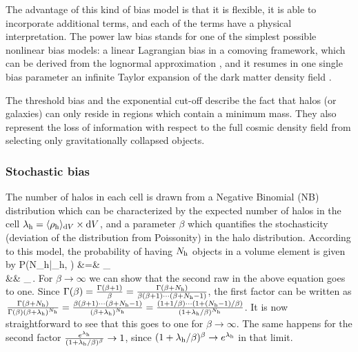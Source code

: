 The advantage of this kind of bias model is that it is flexible, it is able to incorporate additional terms, and each of the terms have a physical interpretation.
The power law bias stands for one of the simplest possible nonlinear bias models: a linear Lagrangian bias in a comoving framework, which can be derived from the lognormal approximation \citep[see][]{kitaura2015}, and it resumes in one single bias parameter an infinite Taylor expansion of the dark matter density field \citep{cen1993,fry1993,delatorre}.

The threshold bias and the exponential cut-off describe the fact that halos (or galaxies) can only reside in regions which contain a minimum mass. They also represent the loss of information with respect to the full cosmic density field from selecting only gravitationally collapsed objects.


\subsubsection{Stochastic bias}

The number of halos in each cell is drawn from a Negative Binomial (NB) distribution which can be characterized by the expected number of halos in the cell $\lambda_{\rm h} = \langle \rho_{\rm h} \rangle_{{\rm d}V} \times {\rm d}V$, and a parameter $\beta$ which quantifies the stochasticity (deviation of the distribution from Poissonity) in the halo distribution. According to this model, the probability of having $N_{\rm h}$ objects in a volume element is given by
\ba
P(N_{\rm h}|\lambda_{\rm h}, \beta) &=& _{} \nonumber \\ 
&\times& _{}\,.
\label{eq:devpois}
\ea
For $\beta\rightarrow\infty$ we can show that the second raw in the above equation goes to one. Since $\Gamma(\beta)=\frac{\Gamma(\beta+1)}{\beta}=\frac{\Gamma(\beta+N_{\rm h})}{\beta(\beta+1)\cdots(\beta+N_{\rm h}-1)}$, the first factor can be written as $\frac{\Gamma(\beta+N_{\rm h})}{\Gamma(\beta)(\beta + \lambda_{\rm h})^{N_{\rm h}}}=\frac{\beta(\beta+1)\cdots(\beta+N_{\rm h}-1)}{(\beta + \lambda_{\rm h})^{N_{\rm h}}}=\frac{(1+1/\beta)\cdots(1+(N_{\rm h}-1)/\beta)}{(1 + \lambda_{\rm h}/\beta)^{N_{\rm h}}}$. It is now straightforward to see that this goes to one for $\beta\rightarrow\infty$. The same happens for the second factor $\frac{e^{\lambda_{\rm h}}}{(1+\lambda_{\rm h}/\beta)^{\beta}}\rightarrow 1$, since $(1+\lambda_{\rm h}/\beta)^{\beta}\rightarrow e^{\lambda_{\rm h}}$ in that limit.

